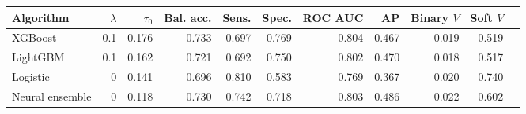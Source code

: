 \begin{tabular}{lrrrrrrrrrr}
\toprule
Algorithm & $\lambda$ & $\tau_0$ & Bal. acc. & Sens. & Spec. & ROC AUC & AP & Binary $V$ & Soft $V$ \\
\midrule
XGBoost & 0.1 & 0.176 & 0.733 & 0.697 & 0.769 & 0.804 & 0.467 & 0.019 & 0.519 \\
LightGBM & 0.1 & 0.162 & 0.721 & 0.692 & 0.750 & 0.802 & 0.470 & 0.018 & 0.517 \\
Logistic & 0 & 0.141 & 0.696 & 0.810 & 0.583 & 0.769 & 0.367 & 0.020 & 0.740 \\
Neural ensemble & 0 & 0.118 & 0.730 & 0.742 & 0.718 & 0.803 & 0.486 & 0.022 & 0.602 \\
\bottomrule
\end{tabular}
